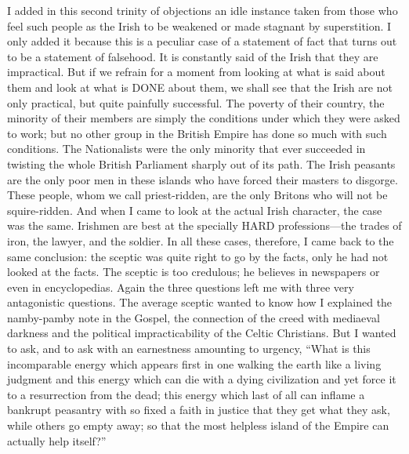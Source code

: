 I added in this second trinity of objections an idle instance taken from those who feel such people as the Irish to be weakened or made stagnant by superstition. I only added it because this is a peculiar case of a statement of fact that turns out to be a statement of falsehood. It is constantly said of the Irish that they are impractical. But if we refrain for a moment from looking at what is said about them and look at what is DONE about them, we shall see that the Irish are not only practical, but quite painfully successful. The poverty of their country, the minority of their members are simply the conditions under which they were asked to work; but no other group in the British Empire has done so much with such conditions. The Nationalists were the only minority that ever succeeded in twisting the whole British Parliament sharply out of its path. The Irish peasants are the only poor men in these islands who have forced their masters to disgorge. These people, whom we call priest-ridden, are the only Britons who will not be squire-ridden. And when I came to look at the actual Irish character, the case was the same. Irishmen are best at the specially HARD professions—the trades of iron, the lawyer, and the soldier. In all these cases, therefore, I came back to the same conclusion: the sceptic was quite right to go by the facts, only he had not looked at the facts. The sceptic is too credulous; he believes in newspapers or even in encyclopedias. Again the three questions left me with three very antagonistic questions. The average sceptic wanted to know how I explained the namby-pamby note in the Gospel, the connection of the creed with mediaeval darkness and the political impracticability of the Celtic Christians. But I wanted to ask, and to ask with an earnestness amounting to urgency, “What is this incomparable energy which appears first in one walking the earth like a living judgment and this energy which can die with a dying civilization and yet force it to a resurrection from the dead; this energy which last of all can inflame a bankrupt peasantry with so fixed a faith in justice that they get what they ask, while others go empty away; so that the most helpless island of the Empire can actually help itself?”

